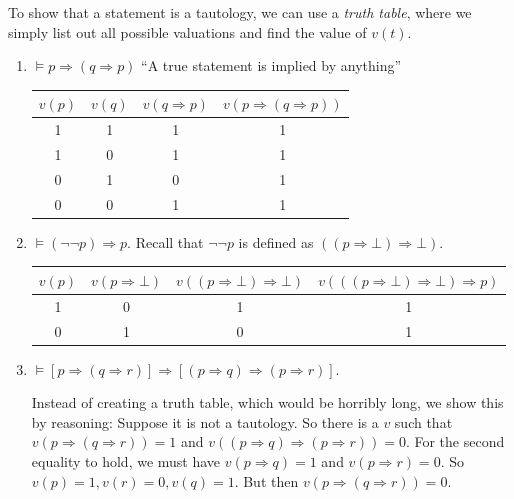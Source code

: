 \documentclass[a4paper]{article}
\begin{document}
To show that a statement is a tautology, we can use a \emph{truth table}, where we simply list out all possible valuations and find the value of $v(t)$.
\begin{eg}\leavevmode
  \begin{enumerate}
    \item $\models p\Rightarrow (q\Rightarrow p)$ ``A true statement is implied by anything''
      \begin{center}
        \begin{tabular}{cccc}
          \toprule
          $v(p)$ & $v(q)$ & $v(q\Rightarrow p)$ & $v(p\Rightarrow (q\Rightarrow p))$\\
          \midrule
          1 & 1 & 1 & 1\\
          1 & 0 & 1 & 1\\
          0 & 1 & 0 & 1\\
          0 & 0 & 1 & 1\\
          \bottomrule
        \end{tabular}
      \end{center}
    \item $\models (\neg \neg p)\Rightarrow p$. Recall that $\neg\neg p$ is defined as $((p\Rightarrow \bot)\Rightarrow \bot)$.
      \begin{center}
        \begin{tabular}{cccc}
          \toprule
          $v(p)$ & $v(p\Rightarrow \bot)$ & $v((p\Rightarrow \bot)\Rightarrow \bot)$ & $v(((p\Rightarrow \bot)\Rightarrow \bot)\Rightarrow p)$\\
          \midrule
          1 & 0 & 1 & 1\\
          0 & 1 & 0 & 1\\
          \bottomrule
        \end{tabular}
      \end{center}
  \item $\models [p\Rightarrow (q\Rightarrow r)]\Rightarrow [(p\Rightarrow q)\Rightarrow (p\Rightarrow r)]$.

    Instead of creating a truth table, which would be horribly long, we show this by reasoning: Suppose it is not a tautology. So there is a $v$ such that $v(p\Rightarrow (q\Rightarrow r)) = 1$ and $v((p\Rightarrow q)\Rightarrow (p\Rightarrow r)) =0 $. For the second equality to hold, we must have $v(p\Rightarrow q) = 1$ and $v(p\Rightarrow r) = 0$. So $v(p) = 1, v(r) = 0, v(q) = 1$. But then $v(p\Rightarrow (q \Rightarrow r)) = 0$.
  \end{enumerate}
\end{eg}
\end{document}
